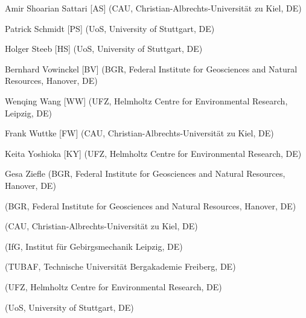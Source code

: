 \begin{list}{-}{\leftmargin=1em \itemindent=0em \itemsep=0.1em}
\item Amir Shoarian Sattari [AS] (CAU, Christian-Albrechts-Universität zu Kiel, DE)

\item Patrick Schmidt [PS] (UoS, University of Stuttgart, DE)	

\item Holger Steeb [HS] (UoS, University of Stuttgart, DE)	

\item Bernhard Vowinckel [BV] (BGR, Federal Institute for Geosciences and Natural Resources, Hanover, DE)	

\item Wenqing Wang [WW] (UFZ, Helmholtz Centre for Environmental Research, Leipzig, DE) 

\item Frank Wuttke [FW] (CAU, Christian-Albrechts-Universität zu Kiel, DE)	

\item Keita Yoshioka [KY] (UFZ, Helmholtz Centre for Environmental Research, DE) 

\item Gesa Ziefle (BGR, Federal Institute for Geosciences and Natural Resources, Hanover, DE)	

\item [] (BGR, Federal Institute for Geosciences and Natural Resources, Hanover, DE)	
\item [] (CAU, Christian-Albrechts-Universität zu Kiel, DE)	
\item [] (IfG, Institut für Gebirgsmechanik Leipzig, DE)	
\item [] (TUBAF, Technische Universit\"at Bergakademie Freiberg, DE)	
\item [] (UFZ, Helmholtz Centre for Environmental Research, DE)	
\item [] (UoS, University of Stuttgart, DE)	

\end{list}
